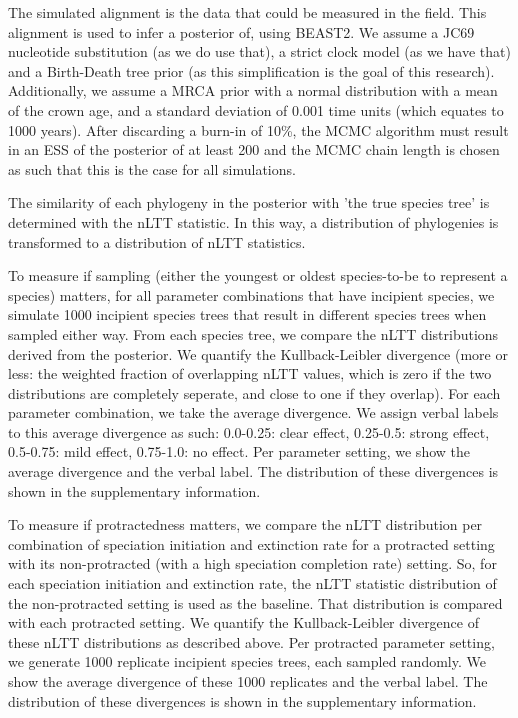 \documentclass{article}
\begin{document}
The simulated alignment is the data that could be measured in the field.
This alignment is used to infer a posterior of, using BEAST2. We assume a
JC69 nucleotide substitution (as we do use that), a strict clock model (as
we have that) and a Birth-Death tree prior (as this simplification is the goal
of this research). Additionally, we assume a MRCA prior with a normal distribution
with a mean of the crown age, and a standard deviation of 0.001 time units (which
equates to 1000 years). After discarding a burn-in of 10\%, the MCMC algorithm must 
result in an ESS of the posterior of at least 200 and the MCMC chain length is 
chosen as such that this is the case for all simulations.

The similarity of each phylogeny in the posterior with 'the true species tree'
is determined with the nLTT statistic. In this way, a distribution of phylogenies
is transformed to a distribution of nLTT statistics. 

To measure if sampling (either the youngest or oldest species-to-be to represent
a species) matters, for all parameter combinations that have incipient species,
we simulate 1000 incipient species trees that result in different species trees
when sampled either way. From each species tree, we compare the nLTT distributions
derived from the posterior. We quantify the Kullback-Leibler divergence (more
or less: the weighted fraction of overlapping nLTT 
values, which is zero if the two distributions are completely seperate, and close
to one if they overlap). For each parameter combination, we take the average
divergence. We assign verbal labels to this average divergence as such: 
0.0-0.25: clear effect, 0.25-0.5: strong effect, 0.5-0.75: mild effect, 
0.75-1.0: no effect. Per parameter setting, we show the average divergence and the 
verbal label. The distribution of these divergences is shown in the 
supplementary information.

To measure if protractedness matters, we compare the nLTT distribution per
combination of speciation initiation and extinction rate for a protracted
setting with its non-protracted (with a high speciation completion 
rate) setting. So, for each speciation initiation and extinction rate, 
the nLTT statistic distribution of the 
non-protracted setting is used as the baseline. That distribution is compared
with each protracted setting. We quantify the Kullback-Leibler divergence 
of these nLTT distributions as described above. Per protracted parameter setting, 
we generate 1000 replicate incipient species trees, each sampled randomly. We show the 
average divergence of these 1000 replicates and the verbal label.
The distribution of these divergences is shown in the supplementary information.
\end{document}
